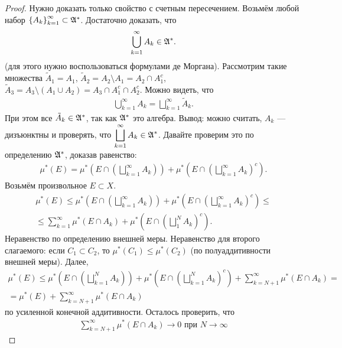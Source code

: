 \begin{proof}
 Нужно доказать только свойство с счетным пересечением. Возьмём любой набор $ \left\{ A_k \right\}_{k=1}^\infty \subset \mathfrak{A}^\ast $. Достаточно доказать, что
 \begin{align*}
	 \bigcup_{k=1}^{\infty} A_k \in \mathfrak{A}^\ast
 .\end{align*} (для этого нужно воспользоваться формулами де Моргана). Рассмотрим такие множества $ \tilde A_1 = A_1 $, $ \tilde A_2 = A_2 \setminus A_1 = A_2 \cap A_1^c$, $ \tilde A_3 = A_3 \setminus (A_1 \cup A_2) = A_3 \cap A_1^c \cap A_2^c$. Можно видеть, что
 \begin{align*}
  \bigcup_{k=1}^\infty A_k = \bigsqcup_{k=1}^\infty \tilde A_k
 .\end{align*} При этом все $ \tilde A_k \in \mathfrak{A}^\ast $, так как $ \mathfrak{A}^\ast $ это алгебра. Вывод: можно считать, $ A_k $ --- дизъюнктны и проверять, что $ \displaystyle \bigsqcup_{k=1}^\infty A_k \in \mathfrak{A}^\ast $. Давайте проверим это по определению $\mathfrak{A}^\ast$, доказав равенство:
 \begin{align*}
   \mu^\ast(E) = \mu^\ast\left( E \cap \left( \bigsqcup_{k=1}^\infty A_k \right) \right) + \mu^\ast\left( E \cap \left( \bigsqcup_{k=1}^\infty A_k \right)^c \right)
 .\end{align*}
 Возьмём произвольное $ E \subset X $.
 \begin{align*}
  \mu^\ast(E) \leqslant \mu^\ast\left( E \cap \left( \bigsqcup_{k=1}^\infty A_k \right) \right) + \mu^\ast\left( E \cap \left( \bigsqcup_{k=1}^\infty A_k \right)^c \right) \leqslant \\
  \leqslant \sum_{k=1}^{\infty} \mu^\ast(E \cap A_k) + \mu^\ast\left( E \cap \left( \bigsqcup_1^N A_k \right)^c \right)
 .\end{align*} Неравенство по определению внешней меры. Неравенство для второго слагаемого: если $ C_1 \subset C_2 $, то $ \mu^\ast(C_1) \leqslant \mu^\ast(C_2) $ (по полуаддитивности внешней меры).
 Далее,
 \begin{align*}
	 \mu^\ast(E) \leqslant \mu^\ast\left( E \cap \left( \bigsqcup_{k=1}^N A_k \right) \right) + \mu^\ast\left( E \cap \left( \bigsqcup_{k=1}^N A_k \right)^c\right) + \sum_{k=N+1}^{\infty} \mu^\ast(E \cap A_k) = \\
  = \mu^\ast(E) + \sum_{k=N+1}^{\infty} \mu^\ast(E \cap A_k)
 \end{align*} по усиленной конечной аддитивности. Осталось проверить, что
 \begin{align*}
  \sum_{k=N+1}^{\infty} \mu^\ast(E \cap A_k) \to 0 \text{ при } N \to \infty

\end{align*}
\end{proof}
